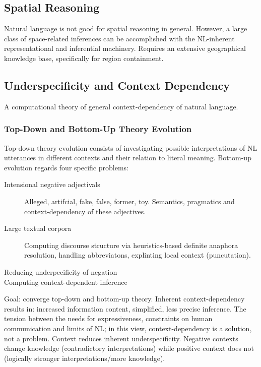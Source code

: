 \documentclass[11pt]{article}
\begin{document}
\subsection{Spatial Reasoning}

Natural language is not good for spatial reasoning in general.  However, a large class of space-related inferences can be accomplished with the NL-inherent representational and inferential machinery.  Requires an extensive geographical knowledge base, specifically for region containment.  
\subsection{Underspecificity and Context Dependency}

A computational theory of general context-dependency of natural language.

\subsubsection{Top-Down and Bottom-Up Theory Evolution}

Top-down theory evolution consists of investigating possible interpretations of NL utterances in different contexts and their relation to literal meaning.  Bottom-up evolution regards four specific problems:

\begin{description}
\item[Intensional negative adjectivals] Alleged, artifcial, fake, false, former, toy.  Semantics, pragmatics and context-dependency of these adjectives.
\item[Large textual corpora] Computing discourse structure via heuristics-based definite anaphora resolution, handling abbreviatons, explinting local context (puncutation).
\item[Reducing underpecificity of negation]
\item[Computing context-dependent inference]
\end{description}

Goal: converge top-down and bottom-up theory.  Inherent context-dependency results in: increased information content, simplified, less precise inference.  The tension between the needs for expressiveness, constraints on human communication and limits of NL; in this view, context-dependency is a solution, not a problem.  Context reduces inherent underspecificity. Negative contexts change knowledge (contradictory interpretations) while positive context does not (logically stronger interpretations/more knowledge).  
\end{document}
